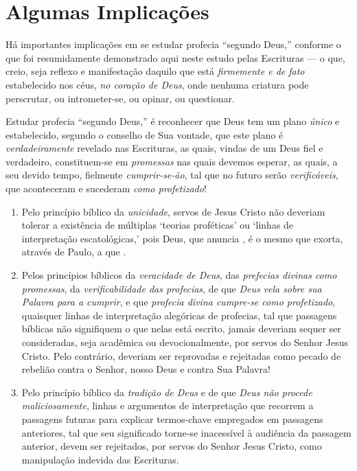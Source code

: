 \section{Algumas Implicações}

    Há importantes implicações em se estudar profecia ``segundo Deus,'' conforme o que foi resumidamente demonstrado aqui  neste
    estudo pelas Escrituras --- o que, creio, seja  reflexo  e  manifestação  daquilo  que  está  \emph{firmemente  e  de  fato}
    estabelecido nos céus, \emph{no coração de Deus}, onde nenhuma criatura pode perscrutar, ou  intrometer-se,  ou  opinar,  ou
    questionar.

    Estudar profecia ``segundo Deus,'' é reconhecer que Deus tem um plano \emph{único} e estabelecido, segundo o conselho de Sua
    vontade, que este plano é \emph{verdadeiramente} revelado nas Escrituras, as quais, vindas de um  Deus  fiel  e  verdadeiro,
    constituem-se em \emph{promessas} nas quais devemos esperar, as quais, a seu devido tempo,  fielmente  \emph{cumprir-se-ão},
    tal que no futuro serão \emph{verificáveis}, que aconteceram e sucederam \emph{como profetizado}!

    \begin{enumerate}

        \item Pelo princípio bíblico da \emph{unicidade}, servos de Jesus Cristo não deveriam tolerar  a  existência
            de múltiplas `teorias proféticas' ou `linhas de interpretação escatológicas,'  pois  Deus,  que  anuncia
            , é o mesmo que  exorta,  através  de  Paulo,  a  que  .

        \item Pelos princípios bíblicos da \emph{veracidade de Deus}, das \emph{prefecias divinas  como  promessas},
            da \emph{verificabilidade das profecias}, de que \emph{Deus vela sobre sua Palavra para  a  cumprir},  e
            que \emph{profecia divina cumpre-se como profetizado}, quaisquer linhas de interpretação  alegóricas  de
            profecias, tal que passagens bíblicas não signifiquem o que nelas está escrito, jamais  deveriam  sequer
            ser consideradas, seja acadêmica ou devocionalmente, por servos do Senhor Jesus Cristo. Pelo  contrário,
            deveriam ser reprovadas e rejeitadas como pecado de rebelião contra o Senhor, nosso Deus  e  contra  Sua
            Palavra!

        \item Pelo princípio bíblico da \emph{tradição de Deus} e de que  \emph{Deus  não  procede  maliciosamente},
            linhas e argumentos de interpretação  que  recorrem  a  passagens  futuras  para  explicar  termos-chave
            empregados em passagens anteriores, tal que seu significado torne-se inacessível à audiência da passagem
            anterior, devem ser rejeitados, por servos  do  Senhor  Jesus  Cristo,  como  manipulação  indevida  das
            Escrituras.

    \end{enumerate}

